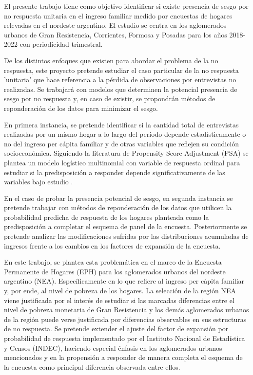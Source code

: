 \documentclass{article}
\begin{document}
El presente trabajo tiene como objetivo identificar si existe presencia de sesgo por no respuesta unitaria en el ingreso familiar medido por encuestas de hogares relevadas en el nordeste argentino. El estudio se centra en los aglomerados urbanos de Gran Resistencia, Corrientes, Formosa y Posadas para los años 2018-2022 con periodicidad trimestral.

De los distintos enfoques que existen para abordar el problema de la no respuesta, este proyecto pretende estudiar el caso particular de la no respuesta 'unitaria' que hace referencia a la pérdida de observaciones por entrevistas no realizadas. Se trabajará con modelos que determinen la potencial presencia de sesgo por no respuesta y, en caso de existir, se propondrán métodos de reponderación de los datos para minimizar el sesgo.

En primera instancia, se pretende identificar si la cantidad total de entrevistas realizadas por un mismo hogar a lo largo del período depende estadísticamente o no del ingreso per cápita familiar y de otras variables que reflejen su condición socioeconómica. Siguiendo la literatura de Propensity Score Adjustment (PSA) se plantea un modelo logístico multinomial con variable de respuesta ordinal para estudiar si la predisposición a responder depende significativamente de las variables bajo estudio \cite{handbook} \cite{korinek07}.

En el caso de probar la presencia potencial de sesgo, en segunda instancia se pretende trabajar con métodos de reponderación de los datos que utilicen la probabilidad predicha de respuesta de los hogares planteada como la predisposición a completar el esquema de panel de la encuesta. Posteriormente se pretende analizar las modificaciones sufridas por las distribuciones acumuladas de ingresos frente a los cambios en los factores de expansión de la encuesta. 

En este trabajo, se plantea esta problemática en el marco de la Encuesta Permanente de Hogares (EPH) para los aglomerados urbanos del nordeste argentino (NEA). Específicamente en lo que refiere al ingreso per cápita familiar y, por ende, al nivel de pobreza de los hogares. La selección de la región NEA viene justificada por el interés de estudiar si las marcadas diferencias entre el nivel de pobreza monetaria de Gran Resistencia y los demás aglomerados urbanos de la región puede verse justificada por diferencias observables en sus estructuras de no respuesta. Se pretende extender el ajuste del factor de expansión por probabilidad de respuesta implementado por el Instituto Nacional de Estadística y Censos (INDEC), haciendo especial énfasis en los aglomerados urbanos mencionados y en la propensión a responder de manera completa el esquema de la encuesta como principal diferencia observada entre ellos.
\end{document}
